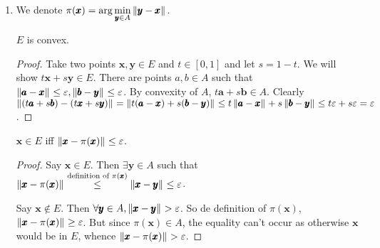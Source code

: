 \begin{enumerate}[label=(\alph*)]
\item %

We denote $\displaystyle\pi(\pmb x) = \arg\min_{\pmb y\in A} \left\lVert \pmb y-\pmb x \right\rVert_{}$.

\begin{cl}$E$ is convex. \end{cl}
\begin{proof}Take two points $\pmb x,\pmb y\in E$ and $t\in [0,1]$ and let $s=1-t$. We will show $t\pmb x+s\pmb y\in E$. There are points $a,b\in A$ such that $\left\lVert \pmb a-\pmb x \right\rVert_{}\le\varepsilon, \left\lVert \pmb b-\pmb y \right\rVert_{}\le \varepsilon$. By convexity of $A$, $t\pmb a+s\pmb b\in A$. Clearly $\left\lVert (t\pmb a+s\pmb b)-(t\pmb x+s\pmb y) \right\rVert_{} = \left\lVert t(\pmb a-\pmb x) + s(\pmb b-\pmb y) \right\rVert_{} \le t\left\lVert \pmb a-\pmb x \right\rVert_{} + s \left\lVert \pmb b-\pmb y \right\rVert_{} \le t\varepsilon+s\varepsilon=\varepsilon$.\end{proof}

\begin{cl}\label{bound}
$\pmb x\in E$ iff $\left\lVert \pmb x-\pi(\pmb x) \right\rVert_{}\le \varepsilon$.\end{cl}
\begin{proof}
Say $\pmb x\in E$. Then $\exists \pmb y\in A$ such that $\left\lVert \pmb x-\pi(\pmb x) \right\rVert_{} \stackrel{\text{definition of }\pi(\pmb x)}{\le} \left\lVert \pmb x-\pmb y \right\rVert_{}\le \varepsilon$.

Say $\pmb x\notin E$. Then $\forall \pmb y\in A, \left\lVert \pmb x-\pmb y \right\rVert_{} > \varepsilon$. So de definition of $\pi(\pmb x)$, $\left\lVert \pmb x-\pi(\pmb x) \right\rVert_{} \ge \varepsilon$. But since $\pi(\pmb x)\in A$, the equality can't occur as otherwise $\pmb x$ would be in $E$, whence $\left\lVert \pmb x-\pi(\pmb x) \right\rVert_{} > \varepsilon$.
\end{proof}


\end{enumerate}
